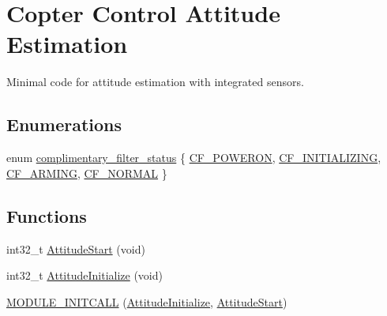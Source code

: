 \hypertarget{group___attitude_module_c_c}{\section{\-Copter \-Control \-Attitude \-Estimation}
\label{group___attitude_module_c_c}
}


\-Minimal code for attitude estimation with integrated sensors.  


\subsection*{\-Enumerations}
\begin{DoxyCompactItemize}
\item 
enum \hyperlink{group___attitude_module_c_c_ga198f64773276a5901d9c79690465e5db}{complimentary\-\_\-filter\-\_\-status} \{ \hyperlink{group___attitude_module_c_c_gga198f64773276a5901d9c79690465e5dba1b205074eafd92be8fbb945482e2c5c2}{\-C\-F\-\_\-\-P\-O\-W\-E\-R\-O\-N}, 
\hyperlink{group___attitude_module_c_c_gga198f64773276a5901d9c79690465e5dbaee904149480808a1828f1e546b365411}{\-C\-F\-\_\-\-I\-N\-I\-T\-I\-A\-L\-I\-Z\-I\-N\-G}, 
\hyperlink{group___attitude_module_c_c_gga198f64773276a5901d9c79690465e5dbaaeeddedb486c25be85918925490e4f7c}{\-C\-F\-\_\-\-A\-R\-M\-I\-N\-G}, 
\hyperlink{group___attitude_module_c_c_gga198f64773276a5901d9c79690465e5dbacfd7a1440ea5820f0b90b2943586a542}{\-C\-F\-\_\-\-N\-O\-R\-M\-A\-L}
 \}
\end{DoxyCompactItemize}
\subsection*{\-Functions}
\begin{DoxyCompactItemize}
\item 
int32\-\_\-t \hyperlink{group___attitude_module_c_c_gaaa0dba388f0dec215cb7cbe55ad0356b}{\-Attitude\-Start} (void)
\item 
int32\-\_\-t \hyperlink{group___attitude_module_c_c_gab3e9047ab7c9b02bd61091a4a2e8f572}{\-Attitude\-Initialize} (void)
\item 
\hyperlink{group___attitude_module_c_c_ga785ebe70505bccce89d20aacd7996a21}{\-M\-O\-D\-U\-L\-E\-\_\-\-I\-N\-I\-T\-C\-A\-L\-L} (\hyperlink{group___attitude_module_gab3e9047ab7c9b02bd61091a4a2e8f572}{\-Attitude\-Initialize}, \hyperlink{group___attitude_module_gaaa0dba388f0dec215cb7cbe55ad0356b}{\-Attitude\-Start})
\end{DoxyCompactItemize}


